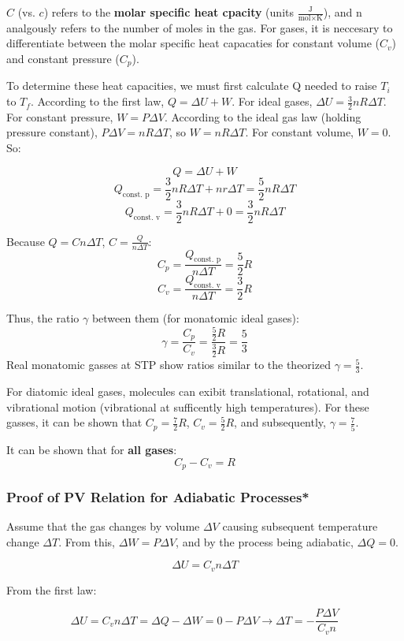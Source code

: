 \documentclass[12pt, a4paper]{article}
\theoremstyle{definition}
\begin{document}
$C$ (vs. $c$) refers to the \textbf{molar specific heat cpacity} (units $\frac{\textrm{J}}{\textrm{mol} \times \textrm{K}}$), and n analgously refers to the number of moles in the gas.
For gases, it is neccesary to differentiate between the molar specific heat capacaties for constant volume ($C_v$) and constant pressure ($C_p$).

To determine these heat capacities, we must first calculate Q needed to raise $T_i$ to $T_f$. According to the first law, $Q = \Delta U + W$.
For ideal gases, $\Delta U = \frac{3}{2}nR\Delta T$.
For constant pressure, $W = P\Delta V$.
According to the ideal gas law (holding pressure constant), $P\Delta V = nR \Delta T$, so $W = nR \Delta T$.
For constant volume, $W = 0$. So:

\[Q = \Delta U + W\]
\[Q_{\textrm{const. p}} = \frac{3}{2}nR\Delta T + nr \Delta T = \frac{5}{2}nR\Delta T\]
\[Q_{\textrm{const. v}} = \frac{3}{2}nR\Delta T + 0 = \frac{3}{2}nR\Delta T\]

Because $Q = Cn\Delta T$, $C = \frac{Q}{n\Delta T}$:
\[C_p = \frac{Q_{\textrm{const. p}}}{n\Delta T} = \frac{5}{2}R\]
\[C_v = \frac{Q_{\textrm{const. v}}}{n\Delta T} = \frac{3}{2}R\]

Thus, the ratio $\gamma$ between them (for monatomic ideal gases):
\[\gamma = \frac{C_p}{C_v} = \frac{\frac{5}{2}R}{\frac{3}{2}R} = \frac{5}{3}\]
Real monatomic gasses at STP show ratios similar to the theorized $\gamma = \frac{5}{3}$.

For diatomic ideal gases, molecules can exibit translational, rotational, and vibrational motion (vibrational at sufficently high temperatures).
For these gasses, it can be shown that $C_p = \frac{7}{2}R$, $C_v = \frac{5}{2}R$, and subsequently, $\gamma = \frac{7}{5}$.

It can be shown that for \textbf{all gases}:
\[C_p - C_v = R\]

\subsubsection{Proof of PV Relation for Adiabatic Processes*}
Assume that the gas changes by volume $\Delta V$ causing subsequent temperature change $\Delta T$.
From this, $\Delta W = P\Delta V$, and by the process being adiabatic, $\Delta Q = 0$.

\[\Delta U = C_v n \Delta T\]

From the first law:

\[\Delta U = C_v n \Delta T = \Delta Q - \Delta W = 0 - P\Delta V \rightarrow \Delta T = -\frac{P \Delta V}{C_v n}\]
\end{document}
